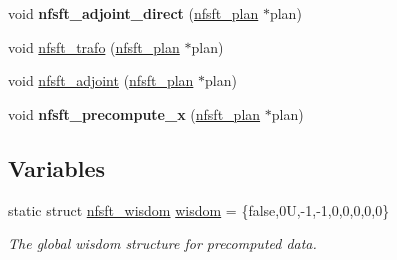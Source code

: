 \begin{DoxyCompactItemize}
\item 
\hypertarget{group__nfsft_ga7cfaacc3393dea5c895859fa035e3e06}{void {\bfseries nfsft\-\_\-adjoint\-\_\-direct} (\hyperlink{structnfsft__plan}{nfsft\-\_\-plan} $\ast$plan)}\label{group__nfsft_ga7cfaacc3393dea5c895859fa035e3e06}

\item 
void \hyperlink{group__nfsft_ga5796fc68c432d46dfcab7abd8c56ee22}{nfsft\-\_\-trafo} (\hyperlink{structnfsft__plan}{nfsft\-\_\-plan} $\ast$plan)
\item 
void \hyperlink{group__nfsft_ga813bb48d404c7286310733c99a81a169}{nfsft\-\_\-adjoint} (\hyperlink{structnfsft__plan}{nfsft\-\_\-plan} $\ast$plan)
\item 
\hypertarget{group__nfsft_ga7a7fa6722d6ba3aade4c69299af86e4e}{void {\bfseries nfsft\-\_\-precompute\-\_\-x} (\hyperlink{structnfsft__plan}{nfsft\-\_\-plan} $\ast$plan)}\label{group__nfsft_ga7a7fa6722d6ba3aade4c69299af86e4e}

\end{DoxyCompactItemize}
\subsection*{Variables}
\begin{DoxyCompactItemize}
\item 
static struct \hyperlink{structnfsft__wisdom}{nfsft\-\_\-wisdom} \hyperlink{group__nfsft_ga0af81d81e1b436949ddc46dbd27346e5}{wisdom} = \{false,0\-U,-\/1,-\/1,0,0,0,0,0\}
\begin{DoxyCompactList}\small\item\em The global wisdom structure for precomputed data. \end{DoxyCompactList}\end{DoxyCompactItemize}


